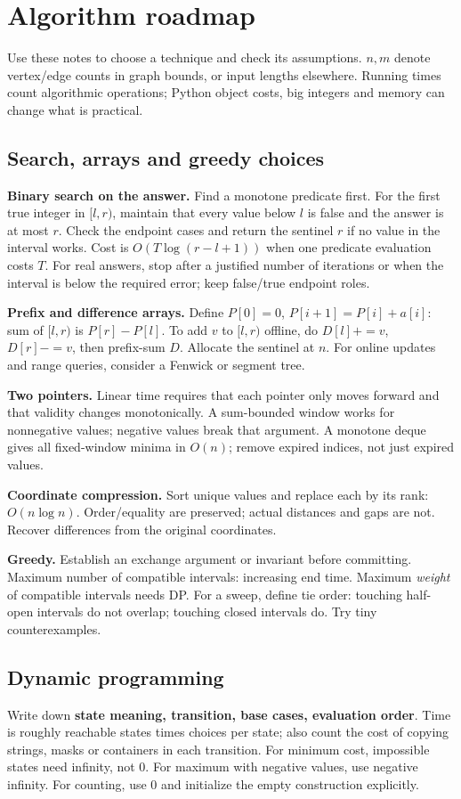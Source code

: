 \section{Algorithm roadmap}
Use these notes to choose a technique and check its assumptions.
$n,m$ denote vertex/edge counts in graph bounds, or input lengths
elsewhere. Running times count algorithmic operations; Python object
costs, big integers and memory can change what is practical.

\subsection{Search, arrays and greedy choices}\label{algo:search}
\textbf{Binary search on the answer.} Find a monotone predicate first.
For the first true integer in $[l,r)$, maintain that every value below
$l$ is false and the answer is at most $r$. Check the endpoint cases
and return the sentinel $r$ if no value in the interval works.
Cost is $O(T\log(r-l+1))$ when one predicate evaluation costs $T$.
For real answers, stop after a justified number of iterations or when
the interval is below the required error; keep false/true endpoint roles.

\textbf{Prefix and difference arrays.} Define $P[0]=0$,
$P[i+1]=P[i]+a[i]$: sum of $[l,r)$ is $P[r]-P[l]$.
To add $v$ to $[l,r)$ offline, do $D[l]{+}{=}v$,
$D[r]{-}{=}v$, then prefix-sum $D$. Allocate the sentinel at $n$.
For online updates and range queries, consider a Fenwick or segment tree.

\textbf{Two pointers.} Linear time requires that each pointer only
moves forward and that validity changes monotonically.
A sum-bounded window works for nonnegative values; negative values
break that argument. A monotone deque gives all fixed-window minima
in $O(n)$; remove expired indices, not just expired values.

\textbf{Coordinate compression.} Sort unique values and replace each
by its rank: $O(n\log n)$. Order/equality are preserved; actual distances
and gaps are not. Recover differences from the original coordinates.

\textbf{Greedy.} Establish an exchange argument or invariant before
committing. Maximum number of compatible intervals: increasing end
time. Maximum \emph{weight} of compatible intervals needs DP.
For a sweep, define tie order: touching half-open intervals do not
overlap; touching closed intervals do. Try tiny counterexamples.

\subsection{Dynamic programming}\label{algo:dp}
Write down \textbf{state meaning, transition, base cases, evaluation order}.
Time is roughly reachable states times choices per state; also count
the cost of copying strings, masks or containers in each transition.
For minimum cost, impossible states need infinity, not 0. For maximum
with negative values, use negative infinity. For counting, use 0 and
initialize the empty construction explicitly.

